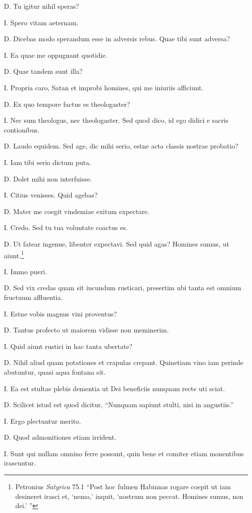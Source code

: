 \documentclass{article}
\begin{document}
D. Tu igitur nihil speras?

I. Spero vitam aeternam.

D. Dicebas modo sperandum esse in adversis rebus. Quae tibi sunt adversa?

I. Ea quae me oppugnant quotidie.

D. Quae tandem sunt illa?

I. Propria caro, Satan et improbi homines, qui me iniuriis afficiunt.

D. Ex quo tempore factus es theologaster?

I. Nec sum theologus, nec theologaster. Sed quod dico, id ego didici e sacris contionibus.

D. Laudo equidem. Sed age, dic mihi serio, estne acta classis nostrae probatio?

I. Iam tibi serio dictum puta.

D. Dolet mihi non interfuisse.

I. Citius venisses. Quid agebas?

D. Mater me coegit vindemiae exitum expectare.

I. Credo. Sed tu tua voluntate coactus es.

D. Ut fatear ingenue, libenter expectavi. Sed quid agas? Homines sumus, ut aiunt.\footnote{Petronius \emph{Satyrica} 75.1 ``Post hoc fulmen Habinnas rogare coepit ut iam desineret irasci et, `nemo,' inquit, `nostrum non peccat. 	Homines sumus, non dei.' ''}

I. Immo pueri.

D. Sed vix credas quam sit iucundum rusticari, presertim ubi tanta est omnium fructuum affluentia.

I. Estne vobis magnus vini proventus?

D. Tantus profecto ut maiorem vidisse non meminerim.

I. Quid aiunt rustici in hac tanta ubertate?

D. Nihil aliud quam potationes et crapulas crepant. Quinetiam vino iam perinde abutuntur, quasi aqua fontana sit.

I. Ea est stultae plebis dementia ut Dei beneficiis nunquam recte uti sciat.

D. Scilicet istud est quod dicitur, ``Nunquam sapiunt stulti, nisi in angustiis.''

I. Ergo plectuntur merito.

D. Quod admonitiones etiam irrident.

I. Sunt qui nullam omnino ferre possunt, quin bene et comiter etiam monentibus irascuntur.
\end{document}
